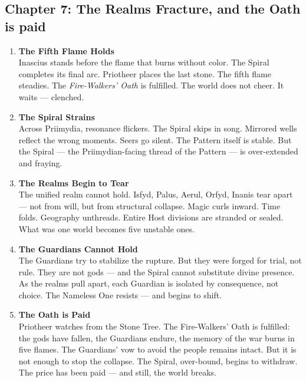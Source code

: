 \documentclass[9pt]{article}
\begin{document}
\subsection*{Chapter 7: The Realms Fracture, and the Oath is paid}

\vspace{1in}

\begin{enumerate}
    \item \textbf{The Fifth Flame Holds} \\
    Inascius stands before the flame that burns without color. The Spiral completes its final arc. Priotheer places the last stone. The fifth flame steadies. The \textit{Fire-Walkers’ Oath} is fulfilled. The world does not cheer. It waits — clenched.

    \vspace{1em}
    \item \textbf{The Spiral Strains} \\
    Across Priimydia, resonance flickers. The Spiral skips in song. Mirrored wells reflect the wrong moments. Seers go silent. The Pattern itself is stable. But the Spiral — the Priimydian-facing thread of the Pattern — is over-extended and fraying.

    \vspace{1em}
    \item \textbf{The Realms Begin to Tear} \\
    The unified realm cannot hold. Isfyd, Palus, Aerul, Orfyd, Inanis tear apart — not from will, but from structural collapse. Magic curls inward. Time folds. Geography unthreads. Entire Host divisions are stranded or sealed. What was one world becomes five unstable ones.

    \vspace{1em}
    \item \textbf{The Guardians Cannot Hold} \\
    The Guardians try to stabilize the rupture. But they were forged for trial, not rule. They are not gods — and the Spiral cannot substitute divine presence. As the realms pull apart, each Guardian is isolated by consequence, not choice. The Nameless One resists — and begins to shift.

    \vspace{1em}
    \item \textbf{The Oath is Paid} \\
    Priotheer watches from the Stone Tree. The Fire-Walkers’ Oath is fulfilled: the gods have fallen, the Guardians endure, the memory of the war burns in five flames. The Guardians’ vow to avoid the people remains intact. But it is not enough to stop the collapse. The Spiral, over-bound, begins to withdraw. The price has been paid — and still, the world breaks.


\end{enumerate}
\end{document}
